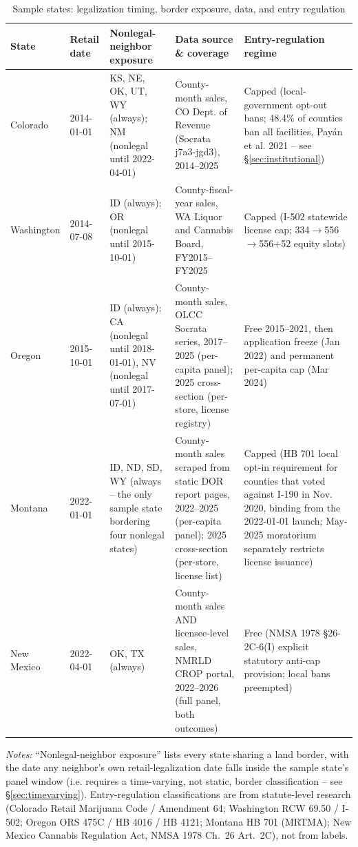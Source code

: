 \begin{table}[htbp]
\centering
\caption{Sample states: legalization timing, border exposure, data, and entry regulation}
\label{tab:state_summary}
\footnotesize
\begin{tabular}{p{1.5cm}p{1.1cm}p{3.6cm}p{3.9cm}p{3.9cm}}
\toprule
State & Retail date & Nonlegal-neighbor exposure & Data source \& coverage & Entry-regulation regime \\
\midrule
Colorado & 2014-01-01 & KS, NE, OK, UT, WY (always); NM (nonlegal until 2022-04-01) & County-month sales, CO Dept. of Revenue (Socrata j7a3-jgd3), 2014--2025 & Capped (local-government opt-out bans; 48.4\% of counties ban all facilities, Pay\'an et al. 2021 -- see \S\ref{sec:institutional}) \\[0.4em]
Washington & 2014-07-08 & ID (always); OR (nonlegal until 2015-10-01) & County-fiscal-year sales, WA Liquor and Cannabis Board, FY2015--FY2025 & Capped (I-502 statewide license cap; 334$\to$556$\to$556+52 equity slots) \\[0.4em]
Oregon & 2015-10-01 & ID (always); CA (nonlegal until 2018-01-01), NV (nonlegal until 2017-07-01) & County-month sales, OLCC Socrata series, 2017--2025 (per-capita panel); 2025 cross-section (per-store, license registry) & Free 2015--2021, then application freeze (Jan 2022) and permanent per-capita cap (Mar 2024) \\[0.4em]
Montana & 2022-01-01 & ID, ND, SD, WY (always -- the only sample state bordering four nonlegal states) & County-month sales scraped from static DOR report pages, 2022--2025 (per-capita panel); 2025 cross-section (per-store, license list) & Capped (HB 701 local opt-in requirement for counties that voted against I-190 in Nov. 2020, binding from the 2022-01-01 launch; May-2025 moratorium separately restricts license issuance) \\[0.4em]
New Mexico & 2022-04-01 & OK, TX (always) & County-month sales AND licensee-level sales, NMRLD CROP portal, 2022--2026 (full panel, both outcomes) & Free (NMSA 1978 \S 26-2C-6(I) explicit statutory anti-cap provision; local bans preempted) \\[0.4em]
\bottomrule
\end{tabular}
\begin{minipage}{0.98\textwidth}
\vspace{0.3em}
\footnotesize
\textit{Notes:} ``Nonlegal-neighbor exposure'' lists every state sharing a land border, with the date any
neighbor's own retail-legalization date falls inside the sample state's panel window (i.e. requires a
time-varying, not static, border classification -- see \S\ref{sec:timevarying}). Entry-regulation
classifications are from statute-level research (Colorado Retail Marijuana Code / Amendment 64; Washington
RCW 69.50 / I-502; Oregon ORS 475C / HB 4016 / HB 4121; Montana HB 701 (MRTMA); New Mexico Cannabis
Regulation Act, NMSA 1978 Ch.\ 26 Art.\ 2C), not from labels.
\end{minipage}
\end{table}
